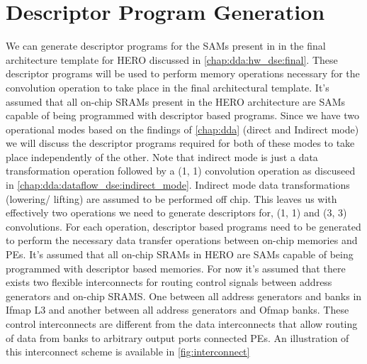 
\clearpage

\section{Descriptor Program Generation}
\label{chap:sams:acc_scheduling}

We can generate descriptor programs for the SAMs present in
in the final architecture template for HERO discussed in \autoref{chap:dda:hw_dse:final}.
These descriptor programs will be used to perform memory operations necessary
for the convolution operation to take place in the final architectural template.
It's assumed that all on-chip SRAMs present in the HERO architecture are SAMs
capable of being programmed with descriptor based programs.   
Since we have two operational modes based on the findings of
\autoref{chap:dda} (direct and Indirect mode) we will discuss the
descriptor programs required for both of these modes to take place independently of
the other. Note that indirect mode is just a data transformation operation
followed by a (1, 1) convolution operation as discuseed in
\autoref{chap:dda:dataflow_dse:indirect_mode}. Indirect mode data
transformations (lowering/ lifting) are assumed to be performed off chip. This leaves us
with effectively two operations we need to generate descriptors for, (1, 1) and (3, 3)
convolutions. For each operation, descriptor based programs need to be generated
to perform the necessary data transfer operations between on-chip memories and
PEs. It's assumed that all on-chip SRAMs in HERO are SAMs capable of being
programmed with descriptor based memories. 
For now it's assumed that there exists two flexible interconnects for routing
control signals between address generators and on-chip SRAMS. One between all
address generators and banks in Ifmap L3 and another between all address
generators and Ofmap banks. These control interconnects are different from the
data interconnects that allow routing of data from banks to arbitrary output
ports connected PEs. An illustration of this interconnect scheme is available in
\autoref{fig:interconnect}

